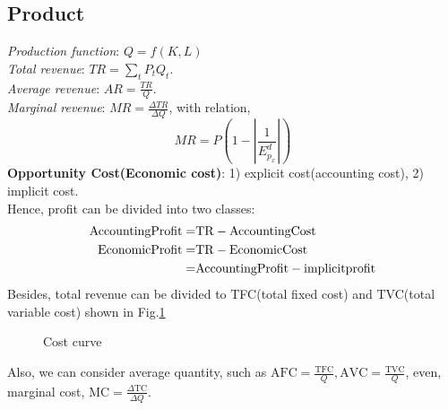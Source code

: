 \documentclass[11pt,a4paper]{article}
\begin{document}
\subsection{Product}
\emph{Production function}: $Q = f(K,L)$\\ 
\emph{Total revenue}: $TR = \sum_t P_t Q_t$. \\ 
\emph{Average revenue}: $AR = \frac{TR}{Q}$. \\ 
\emph{Marginal revenue}: $MR = \frac{\Delta TR}{\Delta Q}$, with relation,
\begin{equation}
    MR = P(1-|\frac{1}{E_{p_x}^d}|)
\end{equation}
\textbf{Opportunity Cost(Economic cost)}: 1) explicit cost(accounting cost), 2) implicit cost.\\ 
Hence, profit can be divided into two classes:
\begin{equation}
\aligned 
    \mathrm{Accounting Profit} =& \mathrm{TR} - \mathrm{Accounting Cost} \\ 
    \mathrm{Economic Profit} = & \mathrm{TR} - \mathrm{Economic Cost} \\ 
    = & \mathrm{Accounting Profit} - \mathrm{implicit profit}
\endaligned
\end{equation} 
Besides, total revenue can be divided to TFC(total fixed cost) and TVC(total variable cost) shown in Fig.\ref{fig:TC} 
\begin{figure}[htb]
    \centering
    \caption{Cost curve}
    \label{fig:TC}
\end{figure}
Also, we can consider average quantity, such as $\mathrm{AFC} = \frac{\mathrm{TFC}}{Q}, \mathrm{AVC} = \frac{\mathrm{TVC}}{Q}$, even, marginal cost, $\mathrm{MC} = \frac{\Delta \mathrm{TC}}{\Delta Q}$.
\end{document}
